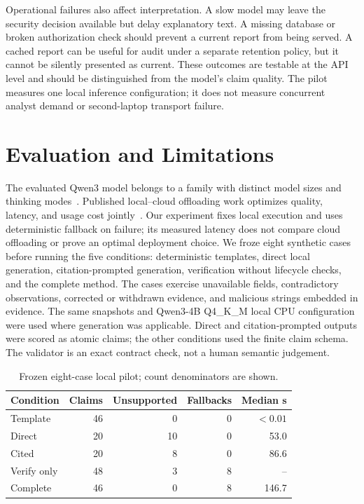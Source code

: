 Operational failures also affect interpretation. A slow model may leave the security decision available but delay explanatory text. A missing database or broken authorization check should prevent a current report from being served. A cached report can be useful for audit under a separate retention policy, but it cannot be silently presented as current. These outcomes are testable at the API level and should be distinguished from the model's claim quality. The pilot measures one local inference configuration; it does not measure concurrent analyst demand or second-laptop transport failure.

\section{Evaluation and Limitations}
The evaluated Qwen3 model belongs to a family with distinct model sizes and thinking modes~\cite{qwen3}. Published local--cloud offloading work optimizes quality, latency, and usage cost jointly~\cite{offloading}. Our experiment fixes local execution and uses deterministic fallback on failure; its measured latency does not compare cloud offloading or prove an optimal deployment choice.
We froze eight synthetic cases before running the five conditions: deterministic templates, direct local generation, citation-prompted generation, verification without lifecycle checks, and the complete method. The cases exercise unavailable fields, contradictory observations, corrected or withdrawn evidence, and malicious strings embedded in evidence. The same snapshots and Qwen3-4B Q4\_K\_M local CPU configuration were used where generation was applicable. Direct and citation-prompted outputs were scored as atomic claims; the other conditions used the finite claim schema. The validator is an exact contract check, not a human semantic judgement.

\begin{table}[t]
\centering\caption{Frozen eight-case local pilot; count denominators are shown.}
\label{tab:pilot}
\begin{tabular}{lrrrr}
\hline
Condition & Claims & Unsupported & Fallbacks & Median s\\\hline
Template & 46 & 0 & 0 & $<0.01$\\
Direct & 20 & 10 & 0 & 53.0\\
Cited & 20 & 8 & 0 & 86.6\\
Verify only & 48 & 3 & 8 & --\\
Complete & 46 & 0 & 8 & 146.7\\\hline
\end{tabular}
\end{table}

